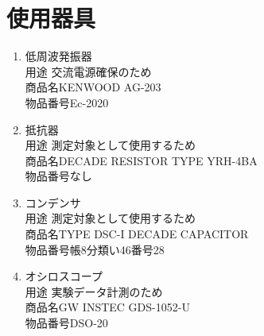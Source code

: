 \documentclass[titlepage]{jarticle}
\begin{document}
\section{使用器具}
\begin{enumerate}
    \item 低周波発振器\\用途 交流電源確保のため\\商品名KENWOOD AG-203\\物品番号Ec-2020
    \item 抵抗器\\用途 測定対象として使用するため\\商品名DECADE RESISTOR TYPE YRH-4BA\\物品番号なし
    \item コンデンサ\\用途 測定対象として使用するため\\商品名TYPE DSC-I DECADE CAPACITOR\\物品番号帳8分類い46番号28
    \item オシロスコープ\\用途 実験データ計測のため\\商品名GW INSTEC GDS-1052-U\\物品番号DSO-20
\end{enumerate}
\end{document}
